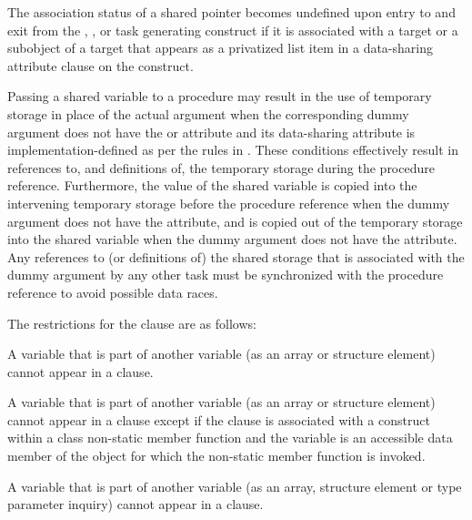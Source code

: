 \begin{fortranspecific}
The association status of a shared pointer becomes undefined upon entry to and 
exit from the , , or task generating construct if 
it is associated with a target or a subobject of a target that appears
as a privatized list item in a data-sharing attribute clause on the construct.


\begin{note}
Passing a shared variable to a procedure may result in the use of temporary 
storage in place of the actual argument when the corresponding dummy argument 
does not have the  or  attribute and its 
data-sharing attribute is implementation-defined as per the rules in
.
These conditions effectively result in references to, and definitions of, the
temporary storage during the procedure reference.  Furthermore, the value of
the shared variable is copied into the intervening temporary storage before 
the procedure reference when the dummy argument does not have the 
attribute, and is copied out of the temporary storage into the shared variable when
the dummy argument does not have the  attribute.  Any
references to (or definitions of) the shared storage that is associated with
the dummy argument by any other task must be synchronized with
the procedure reference to avoid possible data races.
\end{note}
\end{fortranspecific}

\restrictions
The restrictions for the  clause are as follows:

\begin{itemize}
\begin{cspecific}
\item A variable that is part of another variable (as an array or structure 
      element) cannot appear in a  clause.
\end{cspecific}

\begin{cppspecific}
\item A variable that is part of another variable (as an array or structure
      element) cannot appear in a  clause except if the 
      clause is associated with a construct within a class non-static member
      function and the variable is an accessible data member of the object for
      which the non-static member function is invoked.
\end{cppspecific}

\begin{fortranspecific}
\item A variable that is part of another variable (as an array, structure element 
      or type parameter inquiry) cannot appear in a  clause.
\end{fortranspecific}

\end{itemize}



